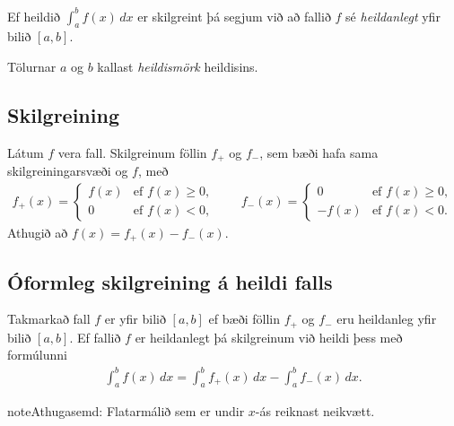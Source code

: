 \documentclass[b5paper,10pt,icelandic]{sphinxmanual}
\begin{document}
Ef heildið \(\int_a^b f(x)\,dx\) er skilgreint þá segjum við að
fallið \(f\) sé \textit{heildanlegt} yfir bilið \([a,b]\).

Tölurnar \(a\) og \(b\) kallast \textit{heildismörk} heildisins.


\subsection{Skilgreining}
\label{\detokenize{kafli06:skilgreining}}
Látum \(f\) vera fall. Skilgreinum föllin \(f_+\) og
\(f_-\), sem bæði hafa sama skilgreiningarsvæði og \(f\), með
\begin{equation*}
\begin{split}f_+(x)=\left\{\begin{array}{ll} f(x) & \mbox{ef }f(x)\geq 0,\\
  0 & \mbox{ef }f(x)<0, \end{array} \right. \qquad
  f_-(x)=\left\{\begin{array}{ll} 0 & \mbox{ef }f(x)\geq 0,\\
  -f(x) & \mbox{ef }f(x)<0. \end{array}\right.\end{split}
\end{equation*}
Athugið að \(f(x)=f_+(x)-f_-(x)\).



\subsection{Óformleg skilgreining á heildi falls}
\label{\detokenize{kafli06:oformleg-skilgreining-a-heildi-falls}}
Takmarkað fall \(f\) er  yfir bilið \([a, b]\) ef
bæði föllin \(f_+\) og \(f_-\) eru heildanleg yfir bilið
\([a,
b]\). Ef fallið \(f\) er heildanlegt þá skilgreinum við heildi þess
með formúlunni
\begin{equation*}
\begin{split}\int_a^b f(x)\,dx=\int_a^b f_+(x)\,dx-\int_a^b f_-(x)\,dx.\end{split}
\end{equation*}
\begin{sphinxadmonition}{note}{Athugasemd:}
Flatarmálið sem er undir \(x\)-ás reiknast neikvætt.
\end{sphinxadmonition}
\end{document}
